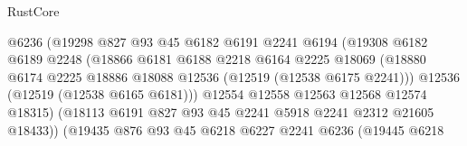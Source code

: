 \begin{lexlean}{RustCore}
\begin{coremodule}
                                    @6236
                                    (@19298
                                      @827
                                      @93
                                      @45
                                      @6182
                                      @6191
                                      @2241
                                      @6194
                                      (@19308
                                        @6182
                                        @6189
                                        @2248
                                        (@18866
                                          @6181
                                          @6188
                                          @2218
                                          @6164
                                          @2225
                                          @18069
                                          (@18880
                                            @6174
                                            @2225
                                            @18886
                                            @18088
                                            @12536
                                            (@12519 (@12538 @6175 @2241)))
                                          @12536
                                          (@12519 (@12538 @6165 @6181)))
                                        @12554
                                        @12558
                                        @12563
                                        @12568
                                        @12574
                                        @18315)
                                      (@18113
                                        @6191
                                        @827
                                        @93
                                        @45
                                        @2241
                                        @5918
                                        @2241
                                        @2312
                                        @21605
                                        @18433))
                                    (@19435
                                      @876
                                      @93
                                      @45
                                      @6218
                                      @6227
                                      @2241
                                      @6236
                                      (@19445
                                        @6218

\end{coremodule}
\end{lexlean}
